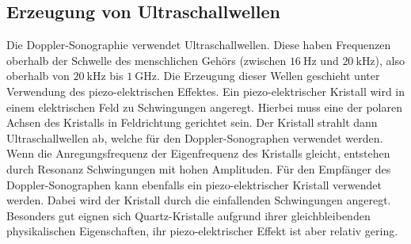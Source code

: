 \subsection{Erzeugung von Ultraschallwellen}
Die Doppler-Sonographie verwendet Ultraschallwellen. Diese haben Frequenzen
oberhalb der Schwelle des menschlichen Gehörs (zwischen $\SI{16}{\hertz}$ und
$\SI{20}{\kilo\hertz}$), also oberhalb von $\SI{20}{\kilo\hertz}$ bis $\SI{1}{\giga\hertz}$.
Die Erzeugung dieser Wellen geschieht unter Verwendung des piezo-elektrischen Effektes.
Ein piezo-elektrischer Kristall wird in einem elektrischen Feld zu Schwingungen angeregt.
Hierbei muss eine der polaren Achsen des Kristalls in Feldrichtung gerichtet sein.
Der Kristall strahlt dann Ultraschallwellen ab, welche für den Doppler-Sonographen verwendet werden.
Wenn die Anregungsfrequenz der Eigenfrequenz des Kristalls gleicht, entstehen durch Resonanz
Schwingungen mit hohen Amplituden.
Für den Empfänger des Doppler-Sonographen kann ebenfalls ein piezo-elektrischer Kristall
verwendet werden. Dabei wird der Kristall durch die einfallenden Schwingungen angeregt.
Besonders gut eignen sich Quartz-Kristalle aufgrund ihrer gleichbleibenden physikalischen
Eigenschaften, ihr piezo-elektrischer Effekt ist aber relativ gering.
